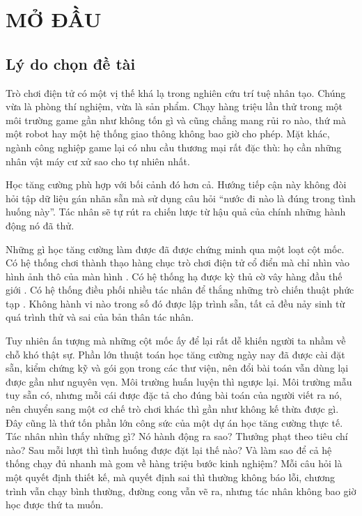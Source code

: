\fontsize{13pt}{22.5pt}\selectfont

\clearpage
\section{MỞ ĐẦU}
\label{ch:intro}

\subsection{Lý do chọn đề tài}

\indent Trò chơi điện tử có một vị thế khá lạ trong nghiên cứu trí tuệ nhân tạo. Chúng
vừa là phòng thí nghiệm, vừa là sản phẩm. Chạy hàng triệu lần thử trong một môi trường
game gần như không tốn gì và cũng chẳng mang rủi ro nào, thứ mà một robot hay
một hệ thống giao thông không bao giờ cho phép. Mặt khác, ngành công nghiệp game
lại có nhu cầu thương mại rất đặc thù: họ cần những nhân vật máy cư xử sao cho tự nhiên nhất.

\indent Học tăng cường phù hợp với bối cảnh đó hơn cả. Hướng tiếp cận này không đòi hỏi
tập dữ liệu gán nhãn sẵn mà sử dụng câu hỏi ``nước đi nào là đúng trong tình huống này''. Tác nhân sẽ tự rút ra chiến lược từ
hậu quả của chính những hành động nó đã thử.

\indent Những gì học tăng cường làm được đã được chứng minh qua một loạt cột mốc. Có hệ
thống chơi thành thạo hàng chục trò chơi điện tử cổ điển mà chỉ nhìn vào hình ảnh thô
của màn hình \cite{mnih2015humanlevel}. Có hệ thống hạ được kỳ thủ cờ vây hàng đầu thế
giới \cite{silver2016mastering}. Có hệ thống điều phối nhiều tác nhân để thắng những trò
chiến thuật phức tạp \cite{openai2019dota, vinyals2019grandmaster}. Không hành vi nào
trong số đó được lập trình sẵn, tất cả đều nảy sinh từ quá trình thử và sai của bản
thân tác nhân.

\indent Tuy nhiên ấn tượng mà những cột mốc ấy để lại rất dễ khiến người ta nhầm về chỗ
khó thật sự. Phần lớn thuật toán học tăng cường ngày nay đã được cài đặt sẵn, kiểm chứng
kỹ và gói gọn trong các thư viện, nên đổi bài toán vẫn dùng lại được gần như nguyên vẹn.
Môi trường huấn luyện thì ngược lại. Môi trường mẫu tuy sẵn có, nhưng mỗi cái được đặc tả
cho đúng bài toán của người viết ra nó, nên chuyển sang một cơ chế trò chơi khác thì gần
như không kế thừa được gì. Đây cũng là thứ tốn phần lớn công sức của một dự án học tăng
cường thực tế. Tác nhân nhìn thấy
những gì? Nó hành động ra sao? Thưởng phạt theo tiêu chí nào? Sau mỗi lượt thì tình
huống được đặt lại thế nào? Và làm sao để cả hệ thống chạy đủ nhanh mà gom về hàng triệu
bước kinh nghiệm? Mỗi câu hỏi là một quyết định
thiết kế, mà quyết định sai thì thường không báo lỗi, chương trình vẫn chạy bình thường,
đường cong vẫn vẽ ra, nhưng tác nhân không bao giờ học được thứ ta muốn.

